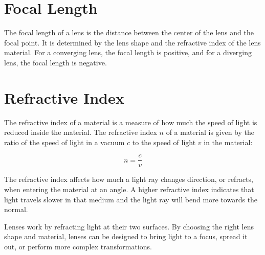 \section{Focal Length}

The focal length of a lens is the distance between the center of the
lens and the focal point. It is determined by the lens shape and the
refractive index of the lens material. For a converging lens, the
focal length is positive, and for a diverging lens, the focal length
is negative.

\section{Refractive Index}

The refractive index of a material is a measure of how much the speed
of light is reduced inside the material. The refractive index $n$ of a
material is given by the ratio of the speed of light in a vacuum $c$
to the speed of light $v$ in the material:

\[
n = \frac{c}{v}
\]

The refractive index affects how much a light ray changes direction,
or refracts, when entering the material at an angle. A higher
refractive index indicates that light travels slower in that medium
and the light ray will bend more towards the normal.

Lenses work by refracting light at their two surfaces. By choosing the
right lens shape and material, lenses can be designed to bring light
to a focus, spread it out, or perform more complex transformations.
